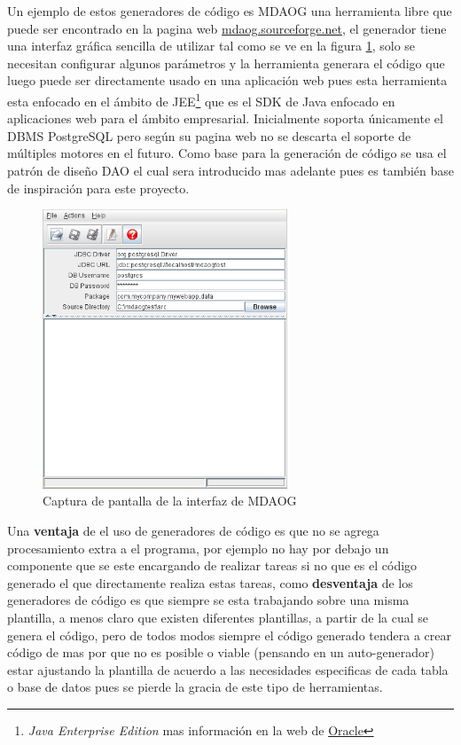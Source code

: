 Un ejemplo de estos generadores de código es MDAOG una herramienta libre que puede ser encontrado en la pagina web \href{http://mdaog.sourceforge.net/}{mdaog.sourceforge.net}, el generador tiene una interfaz gráfica sencilla de utilizar tal como se ve en la figura \ref{fig:mdaog}, solo se necesitan configurar algunos parámetros y la herramienta generara el código que luego puede ser directamente usado en una aplicación web pues esta herramienta esta enfocado en el ámbito de JEE\footnote{\textit{Java Enterprise Edition} mas información en la web de \href{http://www.oracle.com/us/technologies/java/enterprise-edition/overview/index.html}{Oracle}} que es el SDK de Java enfocado en aplicaciones web para el ámbito empresarial. Inicialmente soporta únicamente el DBMS PostgreSQL pero según su pagina web no se descarta el soporte de múltiples motores en el futuro. Como base para la generación de código se usa el patrón de diseño DAO el cual sera introducido mas adelante pues es también base de inspiración para este proyecto.  
%
\begin{figure}
  \centering
    \includegraphics[width=0.65\textwidth]{figuras/mdaogMetal.png}
  \caption{Captura de pantalla de la interfaz de MDAOG}
  \label{fig:mdaog}
\end{figure}

Una \textbf{ventaja} de el uso de generadores de código es que no se agrega procesamiento extra a el programa, por ejemplo no hay por debajo un componente que se este encargando de realizar tareas si no que es el código generado el que directamente realiza estas tareas, como \textbf{desventaja} de los generadores de código es que siempre se esta trabajando sobre una misma plantilla, a menos claro que existen diferentes plantillas, a partir de la cual se genera el código, pero de todos modos siempre el código generado tendera a crear código de mas por que no es posible o viable (pensando en un auto-generador) estar ajustando la plantilla de acuerdo a las necesidades especificas de cada tabla o base de datos pues se pierde la gracia de este tipo de herramientas.
%
